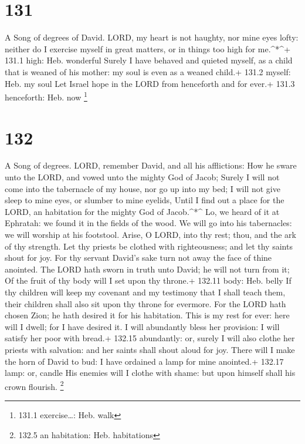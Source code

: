 \hypertarget{section-131}{%
\section{131}\label{section-131}}

A Song of degrees of David.  LORD, my heart is not haughty,
nor mine eyes lofty: neither do I exercise myself in great matters, or
in things too high for me.\^{}*\^{}+ 131.1 high: Heb. wonderful
 Surely I have behaved and quieted myself, as a child that
is weaned of his mother: my soul is even as a weaned child.+ 131.2
myself: Heb. my soul  Let Israel hope in the LORD from
henceforth and for ever.+ 131.3 henceforth: Heb. now \footnote{131.1
  exercise\ldots: Heb. walk}

\hypertarget{section-132}{%
\section{132}\label{section-132}}

A Song of degrees.  LORD, remember David, and all his
afflictions:  How he sware unto the LORD, and vowed unto the
mighty God of Jacob;  Surely I will not come into the
tabernacle of my house, nor go up into my bed;  I will not
give sleep to mine eyes, or slumber to mine eyelids,  Until
I find out a place for the LORD, an habitation for the mighty God of
Jacob.\^{}*\^{}  Lo, we heard of it at Ephratah: we found it
in the fields of the wood.  We will go into his tabernacles:
we will worship at his footstool.  Arise, O LORD, into thy
rest; thou, and the ark of thy strength.  Let thy priests be
clothed with righteousness; and let thy saints shout for joy.
 For thy servant David's sake turn not away the face of
thine anointed.  The LORD hath sworn in truth unto David;
he will not turn from it; Of the fruit of thy body will I set upon thy
throne.+ 132.11 body: Heb. belly  If thy children will keep
my covenant and my testimony that I shall teach them, their children
shall also sit upon thy throne for evermore.  For the LORD
hath chosen Zion; he hath desired it for his habitation. 
This is my rest for ever: here will I dwell; for I have desired it.
 I will abundantly bless her provision: I will satisfy her
poor with bread.+ 132.15 abundantly: or, surely  I will
also clothe her priests with salvation: and her saints shall shout aloud
for joy.  There will I make the horn of David to bud: I
have ordained a lamp for mine anointed.+ 132.17 lamp: or, candle
 His enemies will I clothe with shame: but upon himself
shall his crown flourish. \footnote{132.5 an habitation: Heb.
  habitations}

